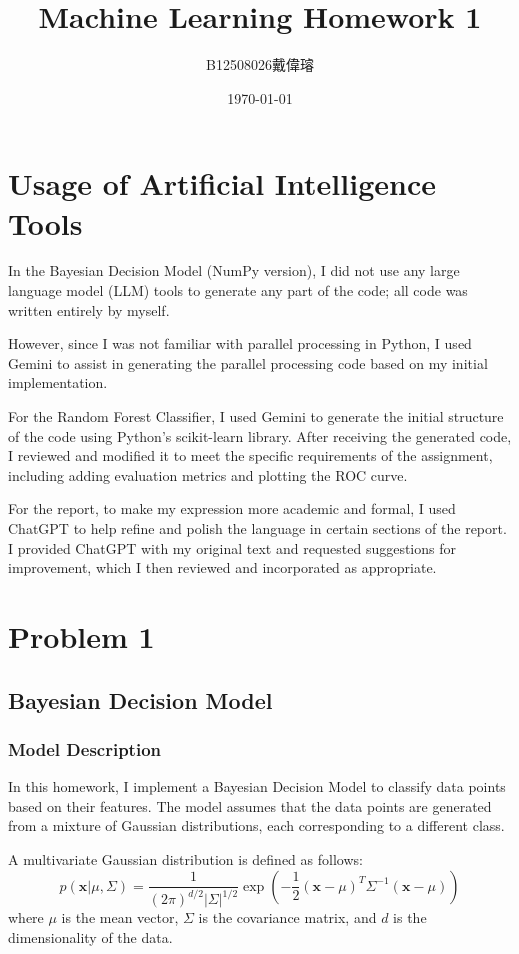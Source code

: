 \documentclass[12pt,a4paper]{article}
\title{Machine Learning Homework 1}
\author{B12508026戴偉璿}
\date{\today}
\begin{document}
\maketitle

\newpage
\tableofcontents
\newpage
\section*{Usage of Artificial Intelligence Tools}
In the Bayesian Decision Model (NumPy version), I did not use any large language model (LLM) tools to generate any part of the code; all code was written entirely by myself.

However, since I was not familiar with parallel processing in Python, I used Gemini to assist in generating the parallel processing code based on my initial implementation.

For the Random Forest Classifier, I used Gemini to generate the initial structure of the code using Python's scikit-learn library. After receiving the generated code, I reviewed and modified it to meet the specific requirements of the assignment, including adding evaluation metrics and plotting the ROC curve.

For the report, to make my expression more academic and formal, I used ChatGPT to help refine and polish the language in certain sections of the report. I provided ChatGPT with my original text and requested suggestions for improvement, which I then reviewed and incorporated as appropriate.

\section{Problem 1}

\subsection{Bayesian Decision Model}
\subsubsection{Model Description}
In this homework, I implement a Bayesian Decision Model to classify data points based on their features. The model assumes that the data points are generated from a mixture of Gaussian distributions, each corresponding to a different class.

A multivariate Gaussian distribution is defined as follows:
\begin{equation}
p(\mathbf{x}|\mu, \Sigma) = \frac{1}{(2\pi)^{d/2} |\Sigma|^{1/2}} \exp\left(-\frac{1}{2}(\mathbf{x}-\mu)^T \Sigma^{-1} (\mathbf{x}-\mu)\right)
\end{equation}
where $\mu$ is the mean vector, $\Sigma$ is the covariance matrix, and $d$ is the dimensionality of the data.
\end{document}
